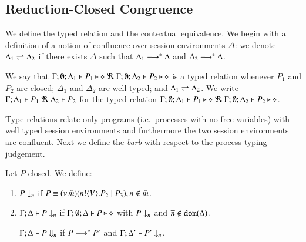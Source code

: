 \subsection{Reduction-Closed Congruence}
\label{subsec:rc}
\noi We define the typed relation and the contextual equivalence.  
We begin with a definition of a notion of confluence
over session environments $\Delta$:
we denote $\Delta_1 \rightleftharpoons \Delta_2$ if there exists $\Delta$ such that
	$\Delta_1 \longrightarrow^\ast \Delta$ and $\Delta_2 \longrightarrow^\ast \Delta$.

\smallskip 

\begin{definition}\rm
	We say that
	$\Gamma; \emptyset; \Delta_1 \vdash P_1 \triangleright \diamond\ \Re \ \Gamma; \emptyset; \Delta_2 \vdash P_2 \triangleright \diamond$
	is a typed relation whenever $P_1$ and $P_2$ are closed;
		$\Delta_1$ and $\Delta_2$ are well typed; and 
		$\Delta_1 \rightleftharpoons \Delta_2$.
We write
$\horel{\Gamma}{\Delta_1}{P_1}{\ \Re \ }{\Delta_2}{P_2}$
for the typed relation $\Gamma; \emptyset; \Delta_1 \vdash P_1 \triangleright \diamond\ \Re \ \Gamma; \emptyset; \Delta_2 \vdash P_2 \triangleright \diamond$.
\end{definition}

\smallskip 

Type relations relate only programs (i.e.\ processes with no free variables) with
well typed session environments and furthermore the two session environments
are confluent.
Next we define the {\em barb} \cite{MiSa92} 
with respect to the process typing judgement. 

\smallskip 

\begin{definition}[Barbs]\rm
Let $P$ closed. We define:
\begin{enumerate}
		\item	$P \downarrow_{n}$ if $P \equiv (\nu\, \tilde{m})(n ! \langle V \rangle . P_2 \;|\; P_3), n \notin \tilde{m}$. %

		\item	$\Gamma; \Delta \vdash P \downarrow_{n}$ if
			$\Gamma; \emptyset; \Delta \vdash P \triangleright \diamond$ with $P \downarrow_{n}$ and $\overline{n} \notin \mathtt{dom}(\Delta)$.

	$\Gamma; \Delta \vdash P \Downarrow_{n}$ if $P \longrightarrow^* P'$ and
			$\Gamma; \Delta' \vdash P' \downarrow_{n}$.			
	\end{enumerate}
\end{definition}

